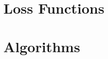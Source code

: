 \documentclass{article}
\begin{document}
\begin{definition}
    
\end{definition}

\begin{example}
    
\end{example}
\newpage

\section{Loss Functions}
\begin{summary}
\end{summary}

\section{Algorithms}
\end{document}
